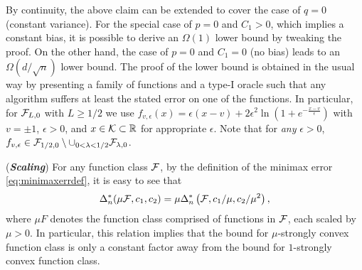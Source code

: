 
By continuity, the above claim can be extended to cover the case of $q=0$ (constant variance). 
For the special case of $p=0$ and $C_1>0$, which implies a constant bias, it is possible to derive an $\Omega(1)$ lower bound by tweaking the proof. On the other hand, the case of $p=0$ and $C_1=0$ (no bias) leads to an $\Omega(d/\sqrt{n})$ lower bound. The proof of the lower bound is obtained in the usual way by presenting a family of functions and a type-I oracle such that any algorithm suffers at least the stated error on one of the functions. In particular, for $\mathcal{F}_{L,0}$ with $L\ge 1/2$ we use
$f_{v,\epsilon}(x)=\epsilon\left( x-v\right)+2\epsilon^2 \ln\left(1+e^{-\frac{x-v}{\epsilon}}  \right)$ with $v=\pm 1$, $\epsilon>0$, and $x \in \mathcal{K} \subset \mathbb{R}$ for appropriate $\epsilon$. Note that for \emph{any} $\epsilon>0$, $f_{v,\epsilon}\in \mathcal{F}_{1/2,0}\setminus \cup_{0<\lambda<1/2} \mathcal{F}_{\lambda,0}$.


\begin{remark}(\textbf{\textit{Scaling}})
For any function class $\mathcal{F}$, by the definition of the minimax error \eqref{eq:minimaxerrdef}, it is easy to see that
$$\Delta_n^*(\mu \mathcal{F}, c_1,c_2) = \mu \Delta_n^*\left(\mathcal{F}, c_1/\mu,c_2/\mu^2\right),$$
 where $\mu F$ denotes the function class comprised of functions in $\mathcal{F}$, each scaled by $\mu>0$. In particular, this relation implies that the bound for $\mu$-strongly convex function class is only a constant factor away from the bound for $1$-strongly convex function class.
\end{remark}

